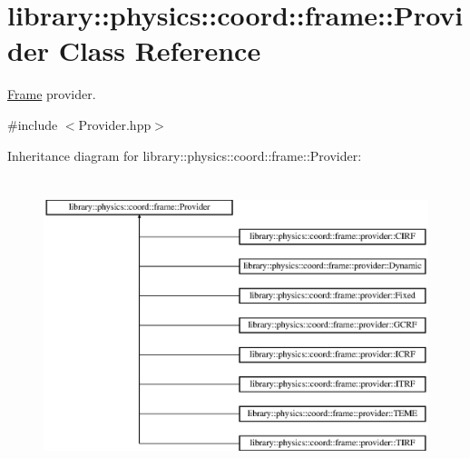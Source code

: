\hypertarget{classlibrary_1_1physics_1_1coord_1_1frame_1_1_provider}{}\section{library\+:\+:physics\+:\+:coord\+:\+:frame\+:\+:Provider Class Reference}
\label{classlibrary_1_1physics_1_1coord_1_1frame_1_1_provider}


\hyperlink{classlibrary_1_1physics_1_1coord_1_1_frame}{Frame} provider.  




{\ttfamily \#include $<$Provider.\+hpp$>$}

Inheritance diagram for library\+:\+:physics\+:\+:coord\+:\+:frame\+:\+:Provider\+:\begin{figure}[H]
\begin{center}
\leavevmode
\includegraphics[height=8.630136cm]{classlibrary_1_1physics_1_1coord_1_1frame_1_1_provider}
\end{center}
\end{figure}
